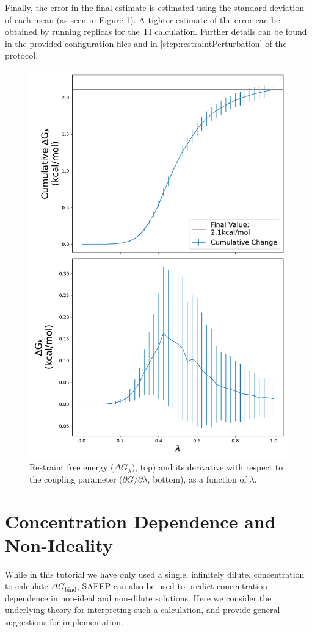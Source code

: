 \documentclass[9pt,tutorial]{Styling/livecoms}
\begin{document}
Finally, the error in the final estimate is estimated using the standard deviation of each mean (as seen in Figure \ref{fig:RFEP2}). A tighter estimate of the error can be obtained by running replicas for the TI calculation. 
Further details can be found in the provided configuration files and in \ref{step:restraintPerturbation} of the protocol.

\begin{figure}[ht]
\includegraphics[width=0.99\linewidth]{RFEP}
\caption{Restraint free energy ($\Delta G_\lambda)$, top) and its derivative with respect to the coupling parameter ($\partial G/\partial\lambda$, bottom), as a function of $\lambda$.}\label{fig:RFEP2}
\end{figure}

\section{Concentration Dependence and Non-Ideality} \label{app:bindingProbability}
While in this tutorial we have only used a single, infinitely dilute, concentration to calculate  $\Delta G_\mathrm{bind}$, SAFEP can also be used to predict concentration dependence in non-ideal and non-dilute solutions.  Here we consider the underlying theory for interpreting such a calculation, and provide general suggestions for implementation.
\end{document}
